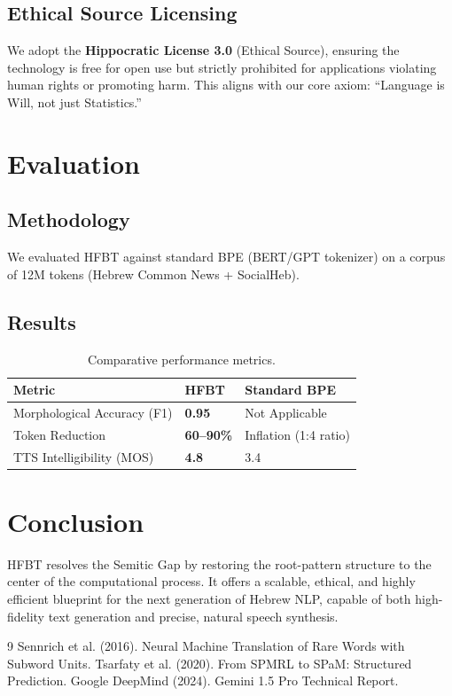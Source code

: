 \documentclass[11pt,a4paper]{article}
\begin{document}
\subsection{Ethical Source Licensing}
We adopt the \textbf{Hippocratic License 3.0} (Ethical Source), ensuring the technology is free for open use but strictly prohibited for applications violating human rights or promoting harm. This aligns with our core axiom: ``Language is Will, not just Statistics.''

\section{Evaluation}

\subsection{Methodology}
We evaluated HFBT against standard BPE (BERT/GPT tokenizer) on a corpus of 12M tokens (Hebrew Common News + SocialHeb).

\subsection{Results}
\begin{table}[h!]
\centering
\begin{tabular}{@{}lll@{}}
\toprule
\textbf{Metric} & \textbf{HFBT} & \textbf{Standard BPE} \\
\midrule
Morphological Accuracy (F1) & \textbf{0.95} & Not Applicable \\
Token Reduction & \textbf{60--90\%} & Inflation (1:4 ratio) \\
TTS Intelligibility (MOS) & \textbf{4.8} & 3.4 \\
\bottomrule
\end{tabular}
\caption{Comparative performance metrics.}
\label{tab:results}
\end{table}

\section{Conclusion}
HFBT resolves the Semitic Gap by restoring the root-pattern structure to the center of the computational process. It offers a scalable, ethical, and highly efficient blueprint for the next generation of Hebrew NLP, capable of both high-fidelity text generation and precise, natural speech synthesis.

\begin{thebibliography}{9}
 Sennrich et al. (2016). Neural Machine Translation of Rare Words with Subword Units.
 Tsarfaty et al. (2020). From SPMRL to SPaM: Structured Prediction.
 Google DeepMind (2024). Gemini 1.5 Pro Technical Report.
\end{thebibliography}
\end{document}
